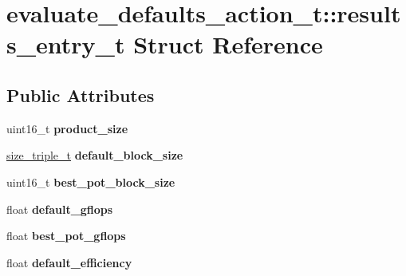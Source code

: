 \hypertarget{structevaluate__defaults__action__t_1_1results__entry__t}{}\section{evaluate\+\_\+defaults\+\_\+action\+\_\+t\+:\+:results\+\_\+entry\+\_\+t Struct Reference}
\label{structevaluate__defaults__action__t_1_1results__entry__t}
\subsection*{Public Attributes}
\begin{DoxyCompactItemize}
\item 
\mbox{\label{structevaluate__defaults__action__t_1_1results__entry__t_a635932e1f6049d9547c6732ba72ccf5b}} 
uint16\+\_\+t {\bfseries product\+\_\+size}
\item 
\mbox{\label{structevaluate__defaults__action__t_1_1results__entry__t_a787e2bf99ae42f614ec3e87ef2567d91}} 
\hyperlink{structsize__triple__t}{size\+\_\+triple\+\_\+t} {\bfseries default\+\_\+block\+\_\+size}
\item 
\mbox{\label{structevaluate__defaults__action__t_1_1results__entry__t_a65d1cd276d4e4aede50526b688356945}} 
uint16\+\_\+t {\bfseries best\+\_\+pot\+\_\+block\+\_\+size}
\item 
\mbox{\label{structevaluate__defaults__action__t_1_1results__entry__t_abe90e458f5f522db5cfe32e17b669869}} 
float {\bfseries default\+\_\+gflops}
\item 
\mbox{\label{structevaluate__defaults__action__t_1_1results__entry__t_a6be92701d05d66687e0580463bdc89a0}} 
float {\bfseries best\+\_\+pot\+\_\+gflops}
\item 
\mbox{\label{structevaluate__defaults__action__t_1_1results__entry__t_a337fdd0019525e13aa40af9cb2934c52}} 
float {\bfseries default\+\_\+efficiency}
\end{DoxyCompactItemize}


